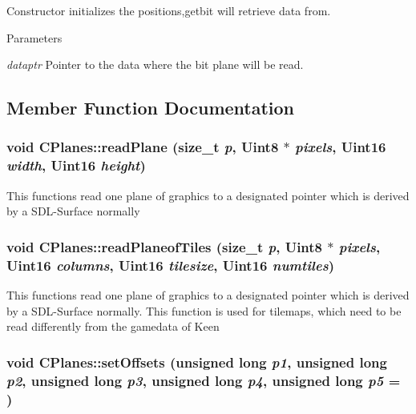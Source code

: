 Constructor initializes the positions,getbit will retrieve data from. 


\begin{DoxyParams}{Parameters}
\item[{\em dataptr}]Pointer to the data where the bit plane will be read. \end{DoxyParams}


\subsection{Member Function Documentation}
\hypertarget{class_c_planes_a87f413375d2b1197590983a7f48c7e97}{
\subsubsection[{readPlane}]{\setlength{\rightskip}{0pt plus 5cm}void CPlanes::readPlane (size\_\-t {\em p}, \/  Uint8 $\ast$ {\em pixels}, \/  Uint16 {\em width}, \/  Uint16 {\em height})}}
\label{class_c_planes_a87f413375d2b1197590983a7f48c7e97}
This functions read one plane of graphics to a designated pointer which is derived by a SDL-\/Surface normally \hypertarget{class_c_planes_ab3470959e52a76f407078df080aa5838}{
\subsubsection[{readPlaneofTiles}]{\setlength{\rightskip}{0pt plus 5cm}void CPlanes::readPlaneofTiles (size\_\-t {\em p}, \/  Uint8 $\ast$ {\em pixels}, \/  Uint16 {\em columns}, \/  Uint16 {\em tilesize}, \/  Uint16 {\em numtiles})}}
\label{class_c_planes_ab3470959e52a76f407078df080aa5838}
This functions read one plane of graphics to a designated pointer which is derived by a SDL-\/Surface normally. This function is used for tilemaps, which need to be read differently from the gamedata of Keen \hypertarget{class_c_planes_aa1713e4cec9409fc7aa5363d798da3d3}{
\subsubsection[{setOffsets}]{\setlength{\rightskip}{0pt plus 5cm}void CPlanes::setOffsets (unsigned long {\em p1}, \/  unsigned long {\em p2}, \/  unsigned long {\em p3}, \/  unsigned long {\em p4}, \/  unsigned long {\em p5} = {})}}
\label{class_c_planes_aa1713e4cec9409fc7aa5363d798da3d3}



